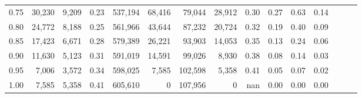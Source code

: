 \begin{tabular}{rrrrrrrrrrrrrrr}
0.75 &  30,230 &  9,209 &  0.23 &  537,194 &   68,416 &   79,044 &   28,912 &  0.30 &  0.27 &  0.63 &      0.14 \\
0.80 &  24,772 &  8,188 &  0.25 &  561,966 &   43,644 &   87,232 &   20,724 &  0.32 &  0.19 &  0.40 &      0.09 \\
0.85 &  17,423 &  6,671 &  0.28 &  579,389 &   26,221 &   93,903 &   14,053 &  0.35 &  0.13 &  0.24 &      0.06 \\
0.90 &  11,630 &  5,123 &  0.31 &  591,019 &   14,591 &   99,026 &    8,930 &  0.38 &  0.08 &  0.14 &      0.03 \\
0.95 &   7,006 &  3,572 &  0.34 &  598,025 &    7,585 &  102,598 &    5,358 &  0.41 &  0.05 &  0.07 &      0.02 \\
1.00 &   7,585 &  5,358 &  0.41 &  605,610 &        0 &  107,956 &        0 &   nan &  0.00 &  0.00 &      0.00 \\
\bottomrule
\end{tabular}

